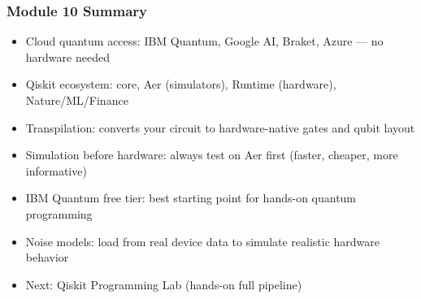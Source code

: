 \begin{frame}[fragile]\frametitle{Module 10 Summary}
\begin{itemize}
\item Cloud quantum access: IBM Quantum, Google AI, Braket, Azure --- no hardware needed
\item Qiskit ecosystem: core, Aer (simulators), Runtime (hardware), Nature/ML/Finance
\item Transpilation: converts your circuit to hardware-native gates and qubit layout
\item Simulation before hardware: always test on Aer first (faster, cheaper, more informative)
\item IBM Quantum free tier: best starting point for hands-on quantum programming
\item Noise models: load from real device data to simulate realistic hardware behavior
\item Next: Qiskit Programming Lab (hands-on full pipeline)
\end{itemize}
\end{frame}
